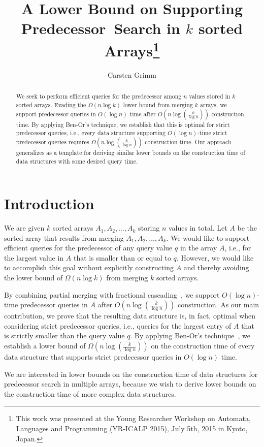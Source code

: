 \documentclass[orivec]{llncs}
\title{A Lower Bound on Supporting Predecessor~Search in \(k\) sorted Arrays\thanks{This work was presented at the Young Researcher Workshop on Automata, Languages and Programming (YR-ICALP 2015), July 5th, 2015 in Kyoto, Japan.}}
\author{Carsten Grimm\inst{1}\fnmsep\inst{2}}
\institute{Otto-von-Guericke-Universität Magdeburg, Magdeburg, Germany \and Carleton University, Ottawa, Ontario, Canada}
\begin{document}
\maketitle
 \vspace{-2\baselineskip}
\begin{abstract}
We seek to perform efficient queries for the predecessor among \(n\) values stored in \(k\) sorted arrays. Evading the \(\Omega(n \log k)\) lower bound from merging \(k\) arrays, we support predecessor queries in \(O(\log n)\) time after \(O(n \log(\frac{k}{\log n}))\) construction time. By applying Ben-Or's technique, we establish that this is optimal for strict predecessor queries, i.e., every data structure supporting \(O(\log n)\)-time strict predecessor queries requires \(\Omega(n \log(\frac{k}{\log n}))\) construction time. Our approach generalizes as a template for deriving similar lower bounds on the construction time of data structures with some desired query time. 
\end{abstract}

\section{Introduction}

We are given \(k\) sorted arrays \(A_1, A_2,\dots, A_k\) storing \(n\) values in total. Let \(A\) be the sorted array that results from merging \(A_1, A_2,\dots, A_k\). We would like to support efficient queries for the predecessor of any query value \(q\) in the array \(A\), i.e., for the largest value in \(A\) that is smaller than or equal to \(q\). However, we would like to accomplish this goal without explicitly constructing \(A\) and thereby avoiding the lower bound of \(\Omega(n \log k)\) from merging \(k\) sorted arrays.

By combining partial merging with fractional cascading~\cite{chazelle1986fractional}, we support \(O(\log n)\)-time predecessor queries in \(A\) after \(O(n \log (\frac k {\log n}))\) construction. As our main contribution, we prove that the resulting data structure is, in fact, optimal when considering strict predecessor queries, i.e., queries for the largest entry of \(A\) that is strictly smaller than the query value \(q\). By applying Ben-Or's technique~\cite{benor1983lower}, we establish a lower bound of \(\Omega(n \log (\frac{k}{\log n}))\) on the construction time of every data structure that supports strict predecessor queries in \(O(\log n)\) time. 

We are interested in lower bounds on the construction time of data structures for predecessor search in multiple arrays, because we wish to derive lower bounds on the construction time of more complex data structures.
\end{document}
